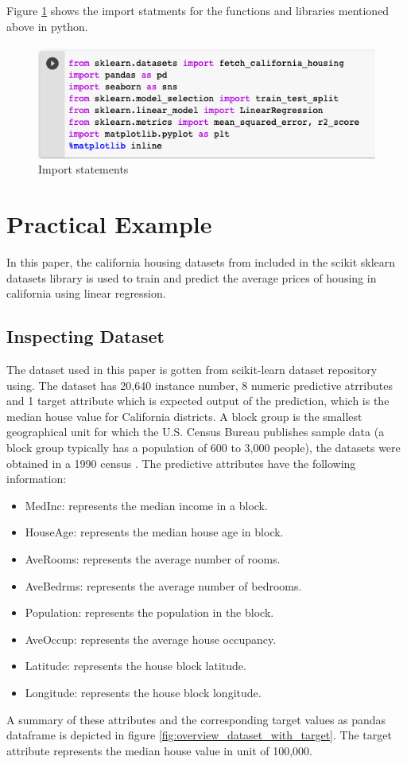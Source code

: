 \documentclass[conference]{IEEEtran}
\begin{document}
 Figure \ref{fig:placeholder} shows the import statments for the functions and libraries mentioned above in python.
 \begin{figure}[htbp]
	\centerline{\includegraphics [scale=0.45]{figures/import_statements.png}}
	\caption{Import statements}
	\label{fig:placeholder}
\end{figure}
\section{Practical Example}
In this paper, the california housing datasets from \cite{KELLEYPACE1997291} included in the scikit sklearn datasets library is used to  train and predict the average prices of housing in california using linear regression. 
\subsection{Inspecting Dataset}
The dataset used in this paper is gotten from scikit-learn dataset repository using. 
The dataset has 20,640 instance number, 8 numeric predictive atrributes and 1 target attribute which is expected output of the prediction, which is the median house value for California districts. A block group is the smallest geographical unit for which the U.S. Census Bureau publishes sample data (a block group typically has a population of 600 to 3,000 people), the datasets were obtained in a 1990 census \cite{KELLEYPACE1997291}.
The predictive attributes have the following information: 
	\begin{itemize}
		\item MedInc: represents the median income in a block.
		\item HouseAge: represents the median house age in block.
        		\item AveRooms: represents the average number of rooms.
        		\item AveBedrms: represents the average number of bedrooms.
        		\item Population: represents the population in the block.
        		\item AveOccup: represents the average house occupancy.
	        \item Latitude: represents the house block latitude.
        		\item Longitude: represents the house block longitude.
	\end{itemize}
A summary of these attributes and the corresponding target values as pandas dataframe is depicted in figure \ref{fig:overview_dataset_with_target}. The target attribute represents the median house value in unit of 100,000.
\end{document}
